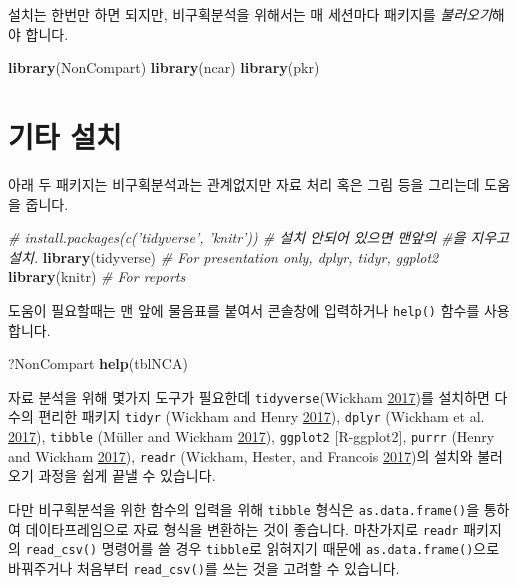 \documentclass[12pt,]{krantz}
\newenvironment{Shaded}{\begin{snugshade}}{\end{snugshade}}
\newcommand{\KeywordTok}[1]{\textcolor[rgb]{0.13,0.29,0.53}{\textbf{#1}}}
\newcommand{\CommentTok}[1]{\textcolor[rgb]{0.56,0.35,0.01}{\textit{#1}}}
\newcommand{\NormalTok}[1]{#1}
\theoremstyle{definition}
\theoremstyle{definition}
\theoremstyle{definition}
\theoremstyle{remark}
\begin{document}
설치는 한번만 하면 되지만, 비구획분석을 위해서는 매 세션마다 패키지를
\emph{불러오기}해야 합니다.

\begin{Shaded}
\begin{Highlighting}[]
\KeywordTok{library}\NormalTok{(NonCompart)}
\KeywordTok{library}\NormalTok{(ncar)}
\KeywordTok{library}\NormalTok{(pkr)}
\end{Highlighting}
\end{Shaded}

\section{기타 설치}\label{-}

아래 두 패키지는 비구획분석과는 관계없지만 자료 처리 혹은 그림 등을
그리는데 도움을 줍니다.

\begin{Shaded}
\begin{Highlighting}[]
\CommentTok{# install.packages(c('tidyverse', 'knitr')) # 설치 안되어 있으면 맨앞의 #을 지우고 설치.}
\KeywordTok{library}\NormalTok{(tidyverse) }\CommentTok{# For presentation only, dplyr, tidyr, ggplot2}
\KeywordTok{library}\NormalTok{(knitr) }\CommentTok{# For reports}
\end{Highlighting}
\end{Shaded}

도움이 필요할때는 맨 앞에 물음표를 붙여서 콘솔창에 입력하거나
\texttt{help()} 함수를 사용합니다.

\begin{Shaded}
\begin{Highlighting}[]
\NormalTok{?NonCompart}
\KeywordTok{help}\NormalTok{(tblNCA)}
\end{Highlighting}
\end{Shaded}

자료 분석을 위해 몇가지 도구가 필요한데 \texttt{tidyverse}(Wickham
\protect\hyperlink{ref-R-tidyverse}{2017})를 설치하면 다수의 편리한
패키지 \texttt{tidyr} (Wickham and Henry
\protect\hyperlink{ref-R-tidyr}{2017}), \texttt{dplyr} (Wickham et al.
\protect\hyperlink{ref-R-dplyr}{2017}), \texttt{tibble} (Müller and
Wickham \protect\hyperlink{ref-R-tibble}{2017}), \texttt{ggplot2}
{[}R-ggplot2{]}, \texttt{purrr} (Henry and Wickham
\protect\hyperlink{ref-R-purrr}{2017}), \texttt{readr} (Wickham, Hester,
and Francois \protect\hyperlink{ref-R-readr}{2017})의 설치와 불러오기
과정을 쉽게 끝낼 수 있습니다.

다만 비구획분석을 위한 함수의 입력을 위해 \texttt{tibble} 형식은
\texttt{as.data.frame()}을 통하여 데이타프레임으로 자료 형식을 변환하는
것이 좋습니다. 마찬가지로 \texttt{readr} 패키지의 \texttt{read\_csv()}
명령어를 쓸 경우 \texttt{tibble}로 읽혀지기 때문에
\texttt{as.data.frame()}으로 바꿔주거나 처음부터 \texttt{read\_csv()}를
쓰는 것을 고려할 수 있습니다.
\end{document}

